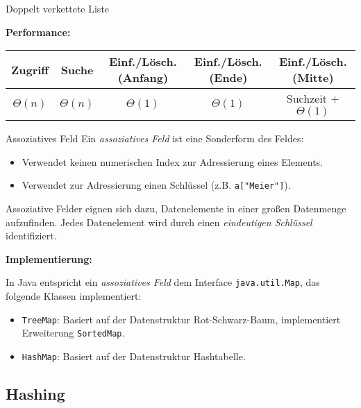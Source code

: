 \documentclass[german]{../spicker}
\begin{document}
\begin{defi}{Doppelt verkettete Liste}
\begin{center}
    \end{center}

    \textbf{Performance:}

    \begin{center}
        \begin{tabular}{c|c|c|c|c}
            Zugriff     & Suche       & Einf./Lösch. (Anfang) & Einf./Lösch. (Ende) & Einf./Lösch. (Mitte)   \\
            \hline
            $\Theta(n)$ & $\Theta(n)$ & $\Theta(1)$           & $\Theta(1)$         & Suchzeit + $\Theta(1)$ \\
        \end{tabular}
    \end{center}
\end{defi}

\begin{defi}{Assoziatives Feld}
    Ein \emph{assoziatives Feld} ist eine Sonderform des Feldes:
    \begin{itemize}
        \item Verwendet keinen numerischen Index zur Adressierung eines Elements.
        \item Verwendet zur Adressierung einen Schlüssel (z.B. \texttt{a["Meier"]}).
    \end{itemize}

    Assoziative Felder eignen sich dazu, Datenelemente in einer großen Datenmenge aufzufinden.
    Jedes Datenelement wird durch einen \emph{eindeutigen Schlüssel} identifiziert.

    \textbf{Implementierung:}

    In Java entspricht ein \emph{assoziatives Feld} dem Interface \texttt{java.util.Map}, das folgende Klassen implementiert:
    \begin{itemize}
        \item \texttt{TreeMap}: Basiert auf der Datenstruktur Rot-Schwarz-Baum, implementiert Erweiterung \texttt{SortedMap}.
        \item \texttt{HashMap}: Basiert auf der Datenstruktur Hashtabelle.
    \end{itemize}
\end{defi}


\subsection{Hashing}
\end{document}
